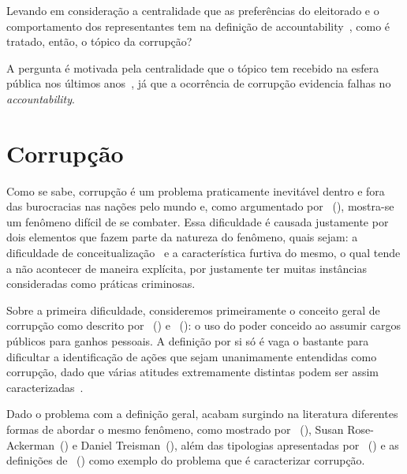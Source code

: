 \documentclass[
	12pt,				%
	openright,			%
	twoside,			%
	a4paper,			%
	openany,
	english,			%
	brazil				%
	]{abntex2}
\begin{document}
Levando em consideração a centralidade que as preferências do eleitorado e o comportamento dos representantes tem na definição de accountability~\cite{fearon1999electoral}, como é tratado, então, o tópico da corrupção?

A pergunta é motivada pela centralidade que o tópico tem recebido na esfera pública nos últimos anos~\cite{fukuyama2018corruption}, já que a ocorrência de corrupção evidencia falhas no \textit{accountability}.
\section{Corrupção}

Como se sabe, corrupção é um problema praticamente inevitável dentro e fora das burocracias nas nações pelo mundo e, como argumentado por ~(\citeyear{Treisman2000Jun}), mostra-se um fenômeno difícil de se combater. Essa dificuldade é causada justamente por dois elementos que fazem parte da natureza do fenômeno, quais sejam: a dificuldade de conceitualização~\cite{bussell2015typologies} e a característica furtiva do mesmo, o qual tende a não acontecer de maneira explícita\cite{Treisman2000Jun, gehrke2018eleiccoes}, por justamente ter muitas instâncias consideradas como práticas criminosas.

Sobre a primeira dificuldade, consideremos primeiramente o conceito geral de corrupção como descrito por ~(\citeyear{Treisman2000Jun}) e ~(\citeyear{fukuyama2018corruption}): o uso do poder conceido ao assumir cargos públicos para ganhos pessoais. A definição por si só é vaga o bastante para dificultar a identificação de ações que sejam unanimamente entendidas como corrupção, dado que várias atitudes extremamente distintas podem ser assim caracterizadas~\cite{fukuyama2018corruption}.

Dado o problema com a definição geral, acabam surgindo na literatura diferentes formas de abordar o mesmo fenômeno, como mostrado por ~(\citeyear{ferraz2008exposing}), Susan Rose-Ackerman~(\citeyear{Rose-Ackerman1996Sep}) e Daniel Treisman~(\citeyear{Treisman2000Jun}), além das tipologias apresentadas por ~(\citeyear{bussell2015typologies}) e as definições de ~(\citeyear{sep-corruption}) como exemplo do problema que é caracterizar corrupção.
\end{document}
